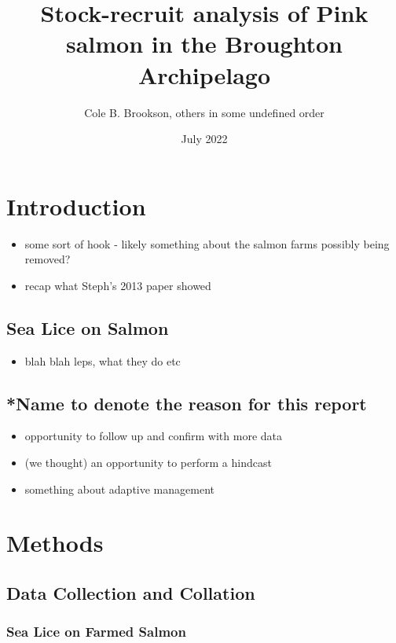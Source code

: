 \documentclass{article}
\title{Stock-recruit analysis of Pink salmon in the Broughton Archipelago}
\author{Cole B. Brookson, others in some undefined order}
\date{July 2022}
\begin{document}
\maketitle

\section{Introduction}

\begin{itemize}
    \item some sort of hook - likely something about the salmon farms possibly being removed? 
    \item recap what Steph's 2013 paper showed
\end{itemize}

\subsection{Sea Lice on Salmon}

\begin{itemize}
    \item blah blah leps, what they do etc 
\end{itemize}

\subsection{*Name to denote the reason for this report}

\begin{itemize}
    \item opportunity to follow up and confirm with more data 
    \item (we thought) an opportunity to perform a hindcast 
    \item something about adaptive management
\end{itemize}

\section{Methods}

\subsection{Data Collection and Collation}

\subsubsection{Sea Lice on Farmed Salmon}
\end{document}
